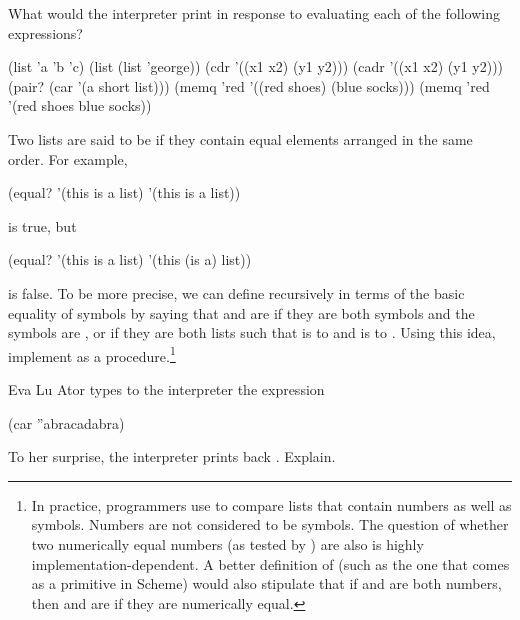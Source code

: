 \begin{exerciseGroup}
\label{Exercise 2.53}
 What would the interpreter print
in response to evaluating each of the following expressions?

\begin{codeBlock}
(list 'a 'b 'c)
(list (list 'george))
(cdr '((x1 x2) (y1 y2)))
(cadr '((x1 x2) (y1 y2)))
(pair? (car '(a short list)))
(memq 'red '((red shoes) (blue socks)))
(memq 'red '(red shoes blue socks))
\end{codeBlock}

\label{Exercise 2.54}
 Two lists are said to be
 if they contain equal elements arranged in the same order.  For
example,

\begin{codeBlock}
(equal? '(this is a list) '(this is a list))
\end{codeBlock}

\noindent
is true, but

\begin{codeBlock}
(equal? '(this is a list) '(this (is a) list))
\end{codeBlock}

\noindent
is false.  To be more precise, we can define   recursively in
terms of the basic  equality of symbols by saying that  and
 are  if they are both symbols and the symbols are
, or if they are both lists such that  is 
to  and  is  to .  Using
this idea, implement  as a procedure.\footnote{In practice,
programmers use  to compare lists that contain numbers as well as
symbols.  Numbers are not considered to be symbols.  The question of whether
two numerically equal numbers (as tested by \code{=}) are also  is
highly implementation-dependent.  A better definition of  (such as
the one that comes as a primitive in Scheme) would also stipulate that if
 and  are both numbers, then  and  are
 if they are numerically equal.}

\label{Exercise 2.55}
 Eva Lu Ator types to the
interpreter the expression

\begin{codeBlock}
(car ''abracadabra)
\end{codeBlock}

To her surprise, the interpreter prints back .  Explain.
\end{exerciseGroup}

